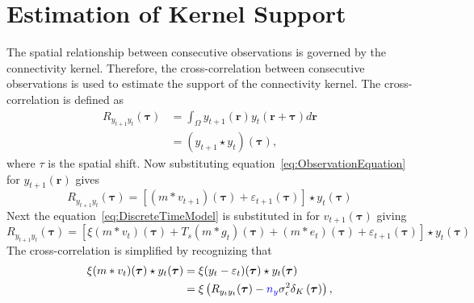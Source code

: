 \documentclass[]{article}
\newcommand{\parham}[1]{\textsf{\emph{\textbf{\textcolor{blue}{#1}}}}}
\begin{document}
\section*{Estimation of Kernel Support}
The spatial relationship between consecutive observations is governed by the connectivity kernel. Therefore, the cross-correlation between consecutive observations is used to estimate the support of the connectivity kernel. The cross-correlation is defined as
\begin{align}
	R_{y_{t+1}y_t}(\boldsymbol{\tau})& =\int_{\Omega} y_{t+1}(\mathbf{r}) y_t(\mathbf{r}+\boldsymbol{\tau}) d\mathbf{r}
 \nonumber \\
 &=(y_{t+1} \star y_t)(\boldsymbol\tau),
\end{align}
where $\tau$ is the spatial shift.  Now substituting equation~\ref{eq:ObservationEquation} for $y_{t+1}(\mathbf{r})$  gives 
\begin{equation}
	R_{y_{t+1}y_t}(\boldsymbol{\tau}) = \left[  (m\ast v_{t+1})(\boldsymbol\tau)+\varepsilon_{t+1}(\boldsymbol\tau)\right] \star  y_t(\boldsymbol{\tau}) 
\end{equation}
Next the equation~\ref{eq:DiscreteTimeModel} is substituted in for $v_{t+1}(\boldsymbol\tau)$ giving 
\begin{equation}
	R_{y_{t+1}y_t}(\boldsymbol{\tau}) = \left[  \xi(m\ast v_{t})(\boldsymbol\tau)+T_s(m\ast g_{t})(\boldsymbol\tau)+(m\ast e_{t})(\boldsymbol{\tau})+\varepsilon_{t+1}(\boldsymbol\tau)\right] \star  y_t(\boldsymbol{\tau}) 
\end{equation}
The cross-correlation is simplified by recognizing that 
\begin{align}
\xi(m\ast v_{t})(\boldsymbol\tau)\star y_t(\boldsymbol\tau)&=\xi(y_t-\varepsilon_t)(\boldsymbol\tau) \star y_t(\boldsymbol\tau)\nonumber \\
&=\xi \left(R_{y_ty_t}(\boldsymbol{\tau})-\parham{$n_y$}\sigma_{\epsilon}^2  \delta_{K}\left(\boldsymbol\tau\right)\right),
\end{align}
\end{document}

